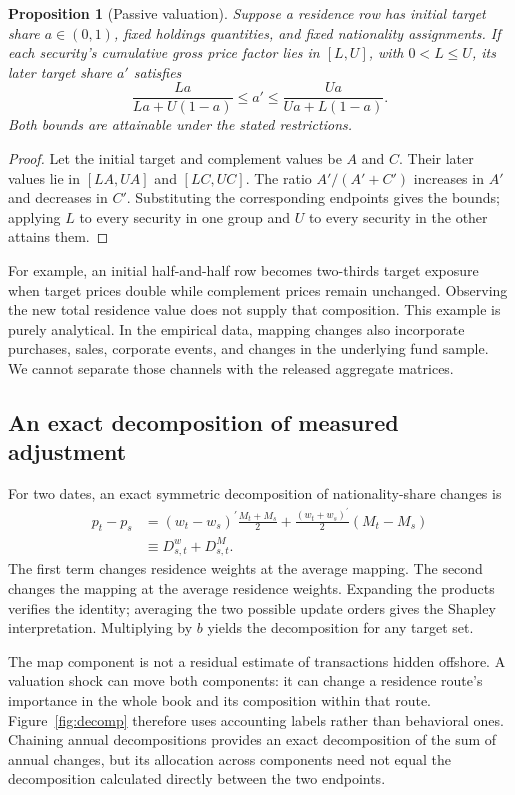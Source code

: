 \documentclass[11pt,a4paper]{article}
\newtheorem{proposition}{Proposition}
\begin{document}
\begin{proposition}[Passive valuation]
Suppose a residence row has initial target share $a\in(0,1)$, fixed holdings quantities, and fixed nationality assignments. If each security's cumulative gross price factor lies in $[L,U]$, with $0<L\leq U$, its later target share $a'$ satisfies
\begin{equation}
 \frac{La}{La+U(1-a)}\leq a'\leq
 \frac{Ua}{Ua+L(1-a)}.
 \label{eq:prices}
\end{equation}
Both bounds are attainable under the stated restrictions.
\end{proposition}
\begin{proof}
Let the initial target and complement values be $A$ and $C$. Their later values lie in $[LA,UA]$ and $[LC,UC]$. The ratio $A'/(A'+C')$ increases in $A'$ and decreases in $C'$. Substituting the corresponding endpoints gives the bounds; applying $L$ to every security in one group and $U$ to every security in the other attains them.
\end{proof}

For example, an initial half-and-half row becomes two-thirds target exposure when target prices double while complement prices remain unchanged. Observing the new total residence value does not supply that composition. This example is purely analytical. In the empirical data, mapping changes also incorporate purchases, sales, corporate events, and changes in the underlying fund sample. We cannot separate those channels with the released aggregate matrices.

\subsection{An exact decomposition of measured adjustment}
For two dates, an exact symmetric decomposition of nationality-share changes is
\begin{align}
 p_t-p_s
 &= (w_t-w_s)^{\prime}\frac{M_t+M_s}{2}
  +\frac{(w_t+w_s)^{\prime}}{2}(M_t-M_s) \\
 &\equiv D^{w}_{s,t}+D^{M}_{s,t}.
 \label{eq:decomp}
\end{align}
The first term changes residence weights at the average mapping. The second changes the mapping at the average residence weights. Expanding the products verifies the identity; averaging the two possible update orders gives the Shapley interpretation. Multiplying by $b$ yields the decomposition for any target set.

The map component is not a residual estimate of transactions hidden offshore. A valuation shock can move both components: it can change a residence route's importance in the whole book and its composition within that route. Figure~\ref{fig:decomp} therefore uses accounting labels rather than behavioral ones. Chaining annual decompositions provides an exact decomposition of the sum of annual changes, but its allocation across components need not equal the decomposition calculated directly between the two endpoints.
\end{document}
